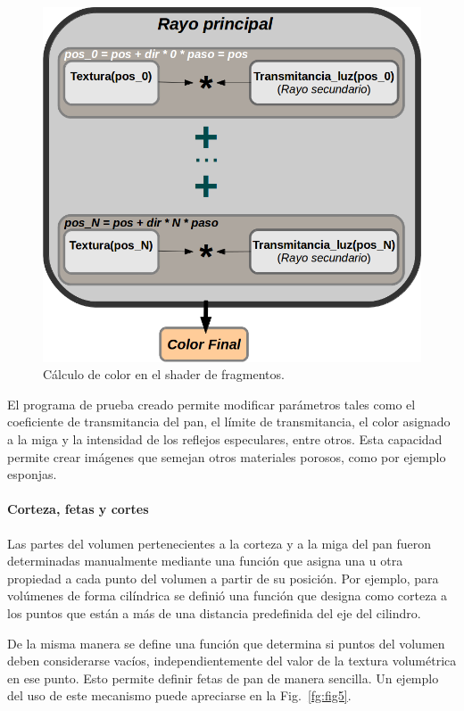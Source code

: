 \documentclass[spanish,a4paper,11pt,oneside,links]{report}
\begin{document}
\begin{figure}[htb!]
  \centerline{\includegraphics[scale=0.5]{fragmentshader}}
  \caption{Cálculo de color en el shader de fragmentos. }
  \label{fg:fragmentshader}
\end{figure}


El programa de prueba creado permite modificar parámetros tales como el coeficiente de transmitancia del pan, el límite de transmitancia, el color asignado a la miga y la intensidad de los reflejos especulares, entre otros. Esta capacidad permite crear imágenes que semejan otros
materiales porosos, como por ejemplo esponjas.

\paragraph{Corteza, fetas y cortes}

Las partes del volumen pertenecientes a la corteza y a la miga del pan fueron determinadas manualmente mediante una función que asigna una u otra propiedad a cada punto del volumen a partir de su posición. Por ejemplo, para volúmenes de forma cilíndrica se definió una función que designa como corteza a los puntos que están a más de una distancia predefinida del eje del cilindro.

De la misma manera se define una función que determina si puntos del volumen deben considerarse vacíos, independientemente del valor de la textura volumétrica en ese punto. Esto permite definir fetas de pan de manera sencilla. Un ejemplo del uso de este mecanismo puede apreciarse
en la Fig.~\ref{fg:fig5}.
\end{document}
